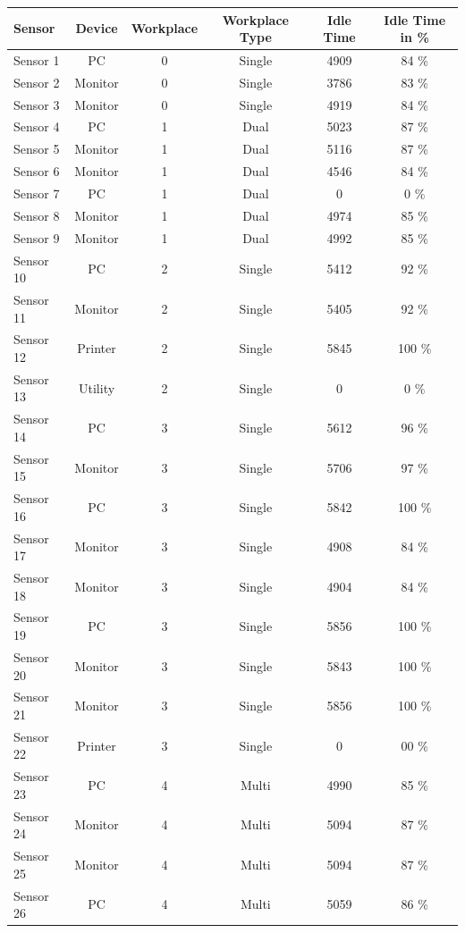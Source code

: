 \begin{table}[ht]
	\centering
	\begin{tabular}{|l|c|c|c|c|c|}%
		\hline%
		Sensor&Device&Workplace&Workplace Type&Idle Time&Idle Time in \%\\%
		\hline%
		Sensor 1&PC&0&Single&4909&84 \%\\%
		\hline%
		Sensor 2&Monitor&0&Single&3786&83 \%\\%
		\hline%
		Sensor 3&Monitor&0&Single&4919&84 \%\\%
		\hline%
		Sensor 4&PC&1&Dual&5023&87 \%\\%
		\hline%
		Sensor 5&Monitor&1&Dual&5116&87 \%\\%
		\hline%
		Sensor 6&Monitor&1&Dual&4546&84 \%\\%
		\hline%
		Sensor 7&PC&1&Dual&0&0 \%\\%
		\hline%
		Sensor 8&Monitor&1&Dual&4974&85 \%\\%
		\hline%
		Sensor 9&Monitor&1&Dual&4992&85 \%\\%
		\hline%
		Sensor 10&PC&2&Single&5412&92 \%\\%
		\hline%
		Sensor 11&Monitor&2&Single&5405&92 \%\\%
		\hline%
		Sensor 12&Printer&2&Single&5845&100 \%\\%
		\hline%
		Sensor 13&Utility&2&Single&0&0 \%\\%
		\hline%
		Sensor 14&PC&3&Single&5612&96 \%\\%
		\hline%
		Sensor 15&Monitor&3&Single&5706&97 \%\\%
		\hline%
		Sensor 16&PC&3&Single&5842&100 \%\\%
		\hline%
		Sensor 17&Monitor&3&Single&4908&84 \%\\%
		\hline%
		Sensor 18&Monitor&3&Single&4904&84 \%\\%
		\hline%
		Sensor 19&PC&3&Single&5856&100 \%\\%
		\hline%
		Sensor 20&Monitor&3&Single&5843&100 \%\\%
		\hline%
		Sensor 21&Monitor&3&Single&5856&100 \%\\%
		\hline%
		Sensor 22&Printer&3&Single&0&00 \%\\%
		\hline%
		Sensor 23&PC&4&Multi&4990&85 \%\\%
		\hline%
		Sensor 24&Monitor&4&Multi&5094&87 \%\\%
		\hline%
		Sensor 25&Monitor&4&Multi&5094&87 \%\\%
		\hline%
		Sensor 26&PC&4&Multi&5059&86 \%\\%

\end{tabular}
\end{table}
